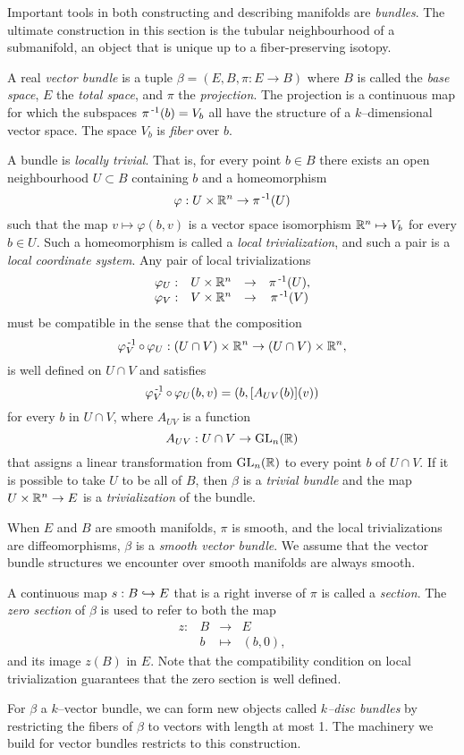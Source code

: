 Important tools in both constructing and describing manifolds are \emph{bundles}.
The ultimate construction in this section is the tubular neighbourhood of a submanifold, an object that is unique up to a fiber-preserving isotopy.

\begin{defn}[Bundle]
	A real \emph{vector bundle} is a tuple $\beta = (E,B,\pi:E\to B)$ where $B$ is called the \emph{base space}, $E$ the \emph{total space}, and $\pi$ the \emph{projection}.
	The projection is a continuous map for which the subspaces $\pi^{\,\text{-}1}(b)=V_b$ all have the structure of a $k$--dimensional vector space.
	The space $V_b$ is \emph{fiber} over $b$.
	
	A bundle is \emph{locally trivial}.
	That is, for every point $b\in B$ there exists an open neighbourhood $U\subset B$ containing $b$ and a homeomorphism
	\[
		\varphi: U\times \mathbb{R}^n\to \pi^{\,\text{-}1}(U)
	\]
	such that the map $v\mapsto\varphi(b,v)$ is a vector space isomorphism $\mathbb{R}^n\mapsto V_b$ for every $b\in U$.
	Such a homeomorphism is called a \emph{local trivialization}, and such a pair is a \emph{local coordinate system}.
	Any pair of local trivializations
	\[
		\begin{array}{cccc}
			\varphi_U: & U\times\mathbb{R}^n & \to & \pi^{\,\text{-}1}(U), \\
			\varphi_V: & V\times\mathbb{R}^n & \to & \pi^{\,\text{-}1}(V)
		\end{array}
	\]
	must be compatible in the sense that the composition 
	\[
		\varphi_V\inv\comp\varphi_U : (U\cap V)\times\RRN\to (U\cap V)\times\RRN,
	\]
	is well defined on $U\cap V$ and satisfies
	\[
		\varphi_V\inv\comp\varphi_U(b,v) = (b, [A_{UV}(b)](v))
	\]
	for every $b$ in $U\cap V$, where $A_{UV}$ is a function
	\[
		A_{UV}: U\cap V\to \textrm{GL}_{n}(\mathbb{R})
	\]
	that assigns a linear transformation from $\textrm{GL}_{n}(\mathbb{R})$ to every point $b$ of $U\cap V$.
	If it is possible to take $U$ to be all of $B$, then $\beta$ is a \emph{trivial bundle} and the map $U\times\mathbb{R}^n\to E$ is a \emph{trivialization} of the bundle.
	
	When $E$ and $B$ are smooth manifolds, $\pi$ is smooth, and the local trivializations are diffeomorphisms, $\beta$ is a \emph{smooth vector bundle}.
	We assume that the vector bundle structures we encounter over smooth manifolds are always smooth.
	
	A continuous map $s:B\hookrightarrow E$ that is a right inverse of $\pi$ is called a \emph{section}.
	The \emph{zero section} of $\beta$ is used to refer to both the map
	\[
		\begin{array}{crcl}
			z: & B & \to 	 & E \\
			   & b & \mapsto & (b,0),
		\end{array}
	\]
	and its image $z(B)$ in $E$.
	Note that the compatibility condition on local trivialization guarantees that the zero section is well defined.
	
	For $\beta$ a $k$--vector bundle, we can form new objects called \emph{$k$--disc bundles} by restricting the fibers of $\beta$ to vectors with length at most 1.
	The machinery we build for vector bundles restricts to this construction.
\end{defn}

